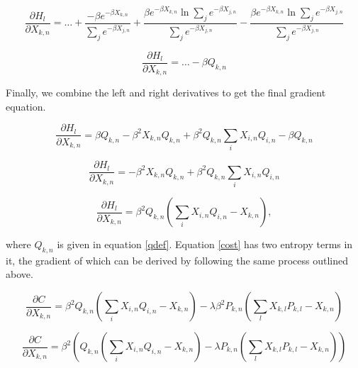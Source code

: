\documentclass[smallextended]{svjour3}       %
\begin{document}
\begin{displaymath}
    \frac{\partial H_{l}}{\partial X_{k,n}} = \ldots + 
    \frac{-\beta e^{-\beta X_{k,n}}}{\sum_{j}e^{-\beta X_{j,n}}}
    + \frac{\beta e^{-\beta X_{k,n}}\ln{\sum_{j}e^{-\beta X_{j,n}}}}{\sum_{j}e^{-\beta X_{j,n}}}
    - \frac{\beta e^{-\beta X_{k,n}}\ln{\sum_{j}e^{-\beta X_{j,n}}}}{\sum_{j}e^{-\beta X_{j,n}}}
\end{displaymath}

\begin{equation}
    \frac{\partial H_{l}}{\partial X_{k,n}} = \ldots - \beta Q_{k,n}
\label{rightd}
\end{equation}

\noindent Finally, we combine the left and right derivatives to get the final gradient equation.

\begin{displaymath}
    \frac{\partial H_{l}}{\partial X_{k,n}} = \beta Q_{k,n} - \beta^{2} X_{k,n} Q_{k,n} + \beta^{2} Q_{k,n} \sum_{i}X_{i,n}Q_{i,n} - \beta Q_{k,n}
\end{displaymath}

\begin{displaymath}
    \frac{\partial H_{l}}{\partial X_{k,n}} = - \beta^{2}X_{k,n}Q_{k,n} + \beta^{2}Q_{k,n}\sum_{i}X_{i,n}Q_{i,n}
\end{displaymath}

\begin{equation}
    \frac{\partial H_{l}}{\partial X_{k,n}} = \beta^{2}Q_{k,n}\left(\sum_{i}X_{i,n}Q_{i,n} - X_{k,n}\right),
\label{combd}
\end{equation}

\noindent where $Q_{k,n}$ is given in equation \ref{qdef}. Equation \ref{cost} has two entropy terms in it, the gradient of which can be derived by following the same process outlined above.

\begin{displaymath}
    \frac{\partial C}{\partial X_{k,n}} = \beta^{2} Q_{k,n} \left(\sum_{i}X_{i,n}Q_{i,n} - X_{k,n}\right) - \lambda \beta^{2} P_{k,n} \left( \sum_{l}X_{k,l}P_{k,l} - X_{k,n}\right)
\end{displaymath}

\begin{equation} \label{costgrad}
    \frac{\partial C}{\partial X_{k,n}} = \beta^{2} \left( Q_{k,n} \left(\sum_{i}X_{i,n}Q_{i,n} - X_{k,n}\right) - \lambda P_{k,n} \left( \sum_{l}X_{k,l}P_{k,l} - X_{k,n}\right)\right)
\end{equation}
\end{document}
